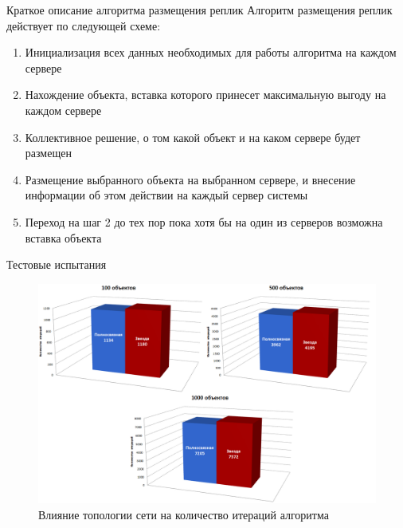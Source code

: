 \documentclass{beamer}
\begin{document}
\begin{frame}[fragile]{Краткое описание алгоритма размещения реплик}
	Алгоритм размещения реплик действует по следующей схеме:
	\begin{enumerate}
		\item Инициализация всех данных необходимых для работы алгоритма на каждом сервере
		\item Нахождение объекта, вставка которого принесет максимальную выгоду на каждом сервере
		\item Коллективное решение, о том какой объект и на каком сервере будет размещен
		\item Размещение выбранного объекта на выбранном сервере, и внесение информации об этом 
			  действии на каждый сервер системы
		\item Переход на шаг 2 до тех пор пока хотя бы на один из серверов возможна вставка объекта
	\end{enumerate}
\end{frame}

\begin{frame}[fragile]{Тестовые испытания}
	\begin{figure}
		\includegraphics[scale=0.2]{img/histograms/top.png}
		\caption{Влияние топологии сети на количество итераций алгоритма}
	\end{figure}
\end{frame}
\end{document}
